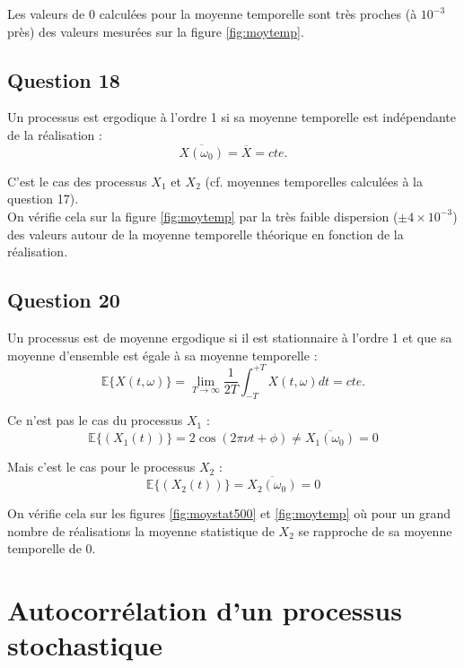 \documentclass{article}
\begin{document}
\noindent
Les valeurs de 0 calculées pour la moyenne temporelle sont très proches (à $10^{-3}$ près) des valeurs mesurées sur la figure \ref{fig:moytemp}.

\subsection*{Question 18}
Un processus est ergodique à l'ordre 1 si sa moyenne temporelle est indépendante de la réalisation :
\begin{equation*}
\overline{X(\omega_0)} = \overline{X} = \mathit{cte.}
\end{equation*}

\noindent
C'est le cas des processus $X_1$ et $X_2$ (cf. moyennes temporelles calculées à la question 17). \\
On vérifie cela sur la figure \ref{fig:moytemp} par la très faible dispersion ($\pm 4\times10^{-3}$) des valeurs autour de la moyenne temporelle théorique en fonction de la réalisation.

\subsection*{Question 20}
Un processus est de moyenne ergodique si il est stationnaire à l'ordre 1 et que sa moyenne d'ensemble est égale à sa moyenne temporelle :
\begin{equation*}
\mathbb{E}\{X(t,\omega)\} = \lim_{T\rightarrow\infty}\frac{1}{2T}\int_{-T}^{+T}X(t,\omega)dt = \mathit{cte.}
\end{equation*}

\noindent
Ce n'est pas le cas du processus $X_1$ :
\begin{equation*}
\mathbb{E}\{(X_1(t))\} = 2\cos(2\pi\nu t+\phi) \neq \overline{X_1(\omega_0)} = 0
\end{equation*}

\noindent
Mais c'est le cas pour le processus $X_2$ :
\begin{equation*}
\mathbb{E}\{(X_2(t))\} = \overline{X_2(\omega_0)} = 0
\end{equation*}

\noindent
On vérifie cela sur les figures \ref{fig:moystat500} et \ref{fig:moytemp} où pour un grand nombre de réalisations la moyenne statistique de $X_2$ se rapproche de sa moyenne temporelle de 0.

\section{Autocorrélation d'un processus stochastique}
\end{document}

